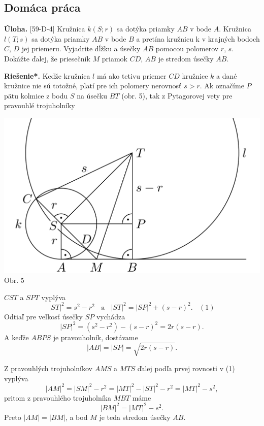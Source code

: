 \documentclass[11pt,a4paper,oneside,final]{book}
\newcommand{\ul}{\textbf{Úloha.} }
\newcommand{\rieh}{\textbf{Riešenie*.} }
\begin{document}
\subsection*{Domáca práca}
\begin{tcolorbox}[breakable,notitle,boxrule=0pt,colback=light-gray,colframe=light-gray]\ul [59-D-4] Kružnica $k(S; r)$ sa dotýka priamky $AB$ v bode $A$. Kružnica $l(T; s)$ sa dotýka priamky $AB$ v bode $B$ a pretína kružnicu k v krajných bodoch $C$, $D$ jej priemeru. Vyjadrite dĺžku a úsečky $AB$ pomocou polomerov $r$, $s$. Dokážte ďalej, že priesečník $M$ priamok $CD$, $AB$ je stredom úsečky $AB$.

\end{tcolorbox}

\rieh Keďže kružnica $l$ má ako tetivu priemer $CD$ kružnice $k$ a dané kružnice nie sú totožné, platí pre ich polomery nerovnosť $s > r$. Ak označíme $P$ pätu kolmice z bodu $S$ na úsečku $BT$ (obr. 5), tak z Pytagorovej vety pre pravouhlé trojuholníky
\begin{center}
\includegraphics[scale=0.3]{59D4}\\

Obr. 5
\end{center}
$CST$ a $SPT$ vyplýva
$$|ST|^2 = s^2 - r^2\ \ \ \ \text{a} \ \ \ \  |ST|^2 = |SP|^2 + (s -r)^2. \ \ \ \  (1)$$
Odtiaľ pre veľkosť úsečky $SP$ vychádza
$$|SP|^2 = (s^2 - r^2 ) - (s - r)^2 = 2r(s - r).$$
A keďže $ABPS$ je pravouholník, dostávame
$$|AB| = |SP| =\sqrt{2r(s - r)}.$$

Z pravouhlých trojuholníkov $AMS$ a $MTS$ ďalej podľa prvej rovnosti v (1) vyplýva
$$|AM|^2 = |SM|^2 - r^2 = |MT|^2- |ST|^2 - r^2 = |MT|^2 -s^2,$$
pritom z pravouhlého trojuholníka $MBT$ máme
$$|BM|^2 = |MT|^2 - s^2.$$
Preto $|AM| = |BM|$, a bod $M$ je teda stredom úsečky $AB$.
\end{document}
